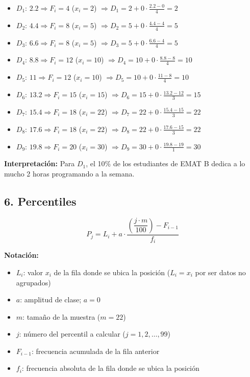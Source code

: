 \documentclass[12pt,letterpaper]{article}
\begin{document}
\begin{itemize}
    \item $D_1$: $2.2 \Rightarrow F_i=4$ ($x_i=2$) $\Rightarrow D_1 = 2 + 0\cdot\frac{2.2-0}{4} = 2$
    \item $D_2$: $4.4 \Rightarrow F_i=8$ ($x_i=5$) $\Rightarrow D_2 = 5 + 0\cdot\frac{4.4-4}{4} = 5$
    \item $D_3$: $6.6 \Rightarrow F_i=8$ ($x_i=5$) $\Rightarrow D_3 = 5 + 0\cdot\frac{6.6-4}{4} = 5$
    \item $D_4$: $8.8 \Rightarrow F_i=12$ ($x_i=10$) $\Rightarrow D_4 = 10 + 0\cdot\frac{8.8-8}{4} = 10$
    \item $D_5$: $11 \Rightarrow F_i=12$ ($x_i=10$) $\Rightarrow D_5 = 10 + 0\cdot\frac{11-8}{4} = 10$
    \item $D_6$: $13.2 \Rightarrow F_i=15$ ($x_i=15$) $\Rightarrow D_6 = 15 + 0\cdot\frac{13.2-12}{3} = 15$
    \item $D_7$: $15.4 \Rightarrow F_i=18$ ($x_i=22$) $\Rightarrow D_7 = 22 + 0\cdot\frac{15.4-15}{3} = 22$
    \item $D_8$: $17.6 \Rightarrow F_i=18$ ($x_i=22$) $\Rightarrow D_8 = 22 + 0\cdot\frac{17.6-15}{3} = 22$
    \item $D_9$: $19.8 \Rightarrow F_i=20$ ($x_i=30$) $\Rightarrow D_9 = 30 + 0\cdot\frac{19.8-19}{1} = 30$
\end{itemize}

\textbf{Interpretación:} Para $D_1$, el 10\% de los estudiantes de EMAT B dedica a lo mucho 2 horas programando a la semana.

\subsection*{6. Percentiles}
\begin{equation*}
    P_j = L_i + a \cdot \frac{\left(\dfrac{j \cdot m}{100}\right) - F_{i-1}}{f_i}
\end{equation*}

\textbf{Notación:}
\begin{itemize}
    \item $L_i$: valor $x_i$ de la fila donde se ubica la posición ($L_i = x_i$ por ser datos no agrupados)
    \item $a$: amplitud de clase; $a = 0$
    \item $m$: tamaño de la muestra ($m=22$)
    \item $j$: número del percentil a calcular ($j=1,2,\dots,99$)
    \item $F_{i-1}$: frecuencia acumulada de la fila anterior
    \item $f_i$: frecuencia absoluta de la fila donde se ubica la posición
\end{itemize}
\end{document}
